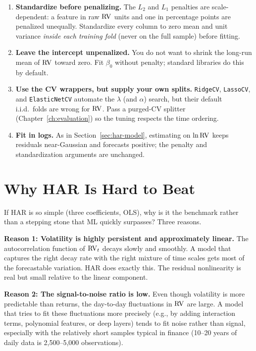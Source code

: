 \begin{keyidea}
\begin{enumerate}[nosep]
  \item \textbf{Standardize before penalizing.} The $L_2$ and $L_1$ penalties are scale-dependent: a feature in raw $\operatorname{RV}$ units and one in percentage points are penalized unequally. Standardize every column to zero mean and unit variance \emph{inside each training fold} (never on the full sample) before fitting.
  \item \textbf{Leave the intercept unpenalized.} You do not want to shrink the long-run mean of $\operatorname{RV}$ toward zero. Fit $\beta_0$ without penalty; standard libraries do this by default.
  \item \textbf{Use the CV wrappers, but supply your own splits.} \texttt{RidgeCV}, \texttt{LassoCV}, and \texttt{ElasticNetCV} automate the $\lambda$ (and $\alpha$) search, but their default i.i.d.\ folds are wrong for $\operatorname{RV}$. Pass a purged-CV splitter (Chapter~\ref{ch:evaluation}) so the tuning respects the time ordering.
  \item \textbf{Fit in logs.} As in Section~\ref{sec:har-model}, estimating on $\ln\operatorname{RV}$ keeps residuals near-Gaussian and forecasts positive; the penalty and standardization arguments are unchanged.
\end{enumerate}
\end{keyidea}

\section{Why HAR Is Hard to Beat}
\label{sec:har-hard-to-beat}

If HAR is so simple (three coefficients, OLS), why is it the benchmark rather than a stepping stone that ML quickly surpasses?
Three reasons.

\textbf{Reason 1: Volatility is highly persistent and approximately linear.}
The autocorrelation function of $\operatorname{RV}_t$ decays slowly and smoothly.
A model that captures the right decay rate with the right mixture of time scales gets most of the forecastable variation.
HAR does exactly this.
The residual nonlinearity is real but small relative to the linear component.

\textbf{Reason 2: The signal-to-noise ratio is low.}
Even though volatility is more predictable than returns, the day-to-day fluctuations in $\operatorname{RV}$ are large.
A model that tries to fit these fluctuations more precisely (e.g., by adding interaction terms, polynomial features, or deep layers) tends to fit noise rather than signal, especially with the relatively short samples typical in finance (10--20 years of daily data is 2,500--5,000 observations).


